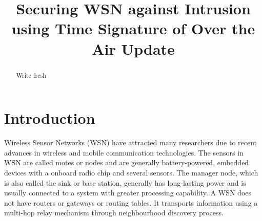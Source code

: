 \documentclass[conference]{IEEEtran}
\begin{document}
\title{Securing WSN against Intrusion using Time Signature of Over the Air Update  }
\author{
}


\maketitle

\begin{abstract}
Write fresh
\end{abstract}


%


\section{Introduction}
\label{sec:intro}
Wireless Sensor Networks (WSN) have attracted many researchers due to recent advances in wireless and mobile communication technologies.
The sensors in WSN are called motes or nodes and are generally battery-powered, embedded devices with a onboard radio chip and several sensors.
The manager node, which is also called the sink or base station, generally has long-lasting power and is usually connected to a system with greater processing capability.
A WSN does not have routers or gateways or routing tables.
It transports information using a multi-hop relay mechanism through neighbourhood discovery process.
\end{document}

